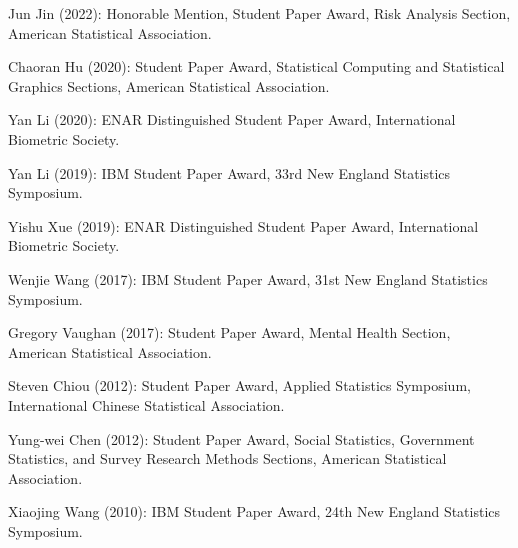 \documentclass[Statistics]{vita}
\begin{document}
\begin{vita}
\begin{TeachingAccomplishments}
\begin{StudentAwards}
    \item Jun Jin (2022): Honorable Mention, Student Paper Award, Risk Analysis Section, American Statistical Association.
    \item Chaoran Hu (2020): Student Paper Award, Statistical Computing and Statistical Graphics Sections, American Statistical Association.
    \item Yan Li (2020): ENAR Distinguished Student Paper Award, International Biometric Society.
    \item Yan Li (2019): IBM Student Paper Award, 33rd New England Statistics Symposium.
    \item Yishu Xue (2019): ENAR Distinguished Student Paper Award, International Biometric Society.
    \item Wenjie Wang (2017): IBM Student Paper Award, 31st New England Statistics Symposium.
    \item Gregory Vaughan (2017): Student Paper Award, Mental Health Section, American Statistical Association.
    \item Steven Chiou (2012): Student Paper Award, Applied Statistics Symposium, International Chinese Statistical Association.
    \item Yung-wei Chen (2012): Student Paper Award,  Social Statistics, Government Statistics, and Survey Research Methods Sections,  American Statistical Association.
    \item Xiaojing Wang (2010): IBM Student Paper Award, 24th New England Statistics Symposium.
    \end{StudentAwards}
    \begin{TeachingHighlights}

\end{TeachingHighlights}
\end{TeachingAccomplishments}
\end{vita}
\end{document}
